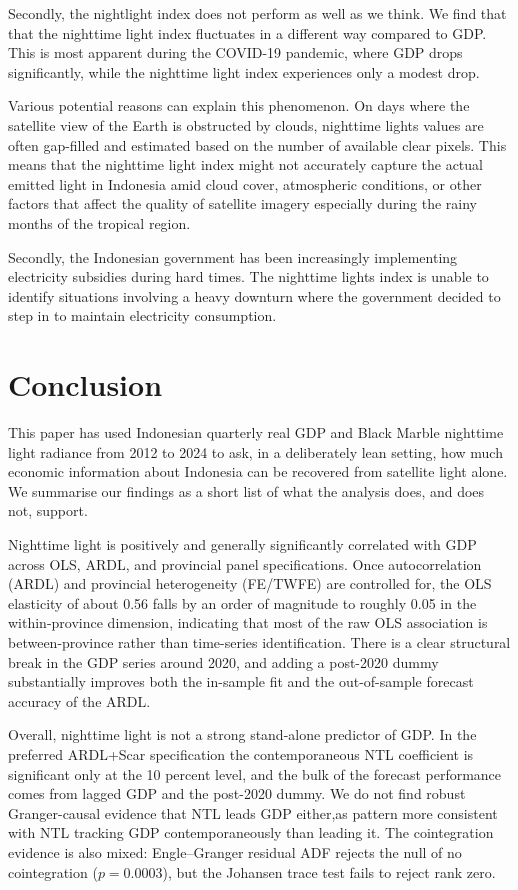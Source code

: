 \documentclass[
  manuscript=article,
  layout=publish,
  year=2026,
  volume=3,
]{den}
\begin{document}
Secondly, the nightlight index does not perform as well as we think. We
find that that the nighttime light index fluctuates in a different way
compared to GDP. This is most apparent during the COVID-19 pandemic,
where GDP drops significantly, while the nighttime light index
experiences only a modest drop.

Various potential reasons can explain this phenomenon. On days where the
satellite view of the Earth is obstructed by clouds, nighttime lights
values are often gap-filled and estimated based on the number of
available clear pixels. This means that the nighttime light index might
not accurately capture the actual emitted light in Indonesia amid cloud
cover, atmospheric conditions, or other factors that affect the quality
of satellite imagery especially during the rainy months of the tropical
region.

Secondly, the Indonesian government has been increasingly implementing
electricity subsidies during hard times. The nighttime lights index is
unable to identify situations involving a heavy downturn where the
government decided to step in to maintain electricity consumption.

\section{Conclusion}\label{conclusion}

This paper has used Indonesian quarterly real GDP and Black Marble
nighttime light radiance from 2012 to 2024 to ask, in a deliberately
lean setting, how much economic information about Indonesia can be
recovered from satellite light alone. We summarise our findings as a
short list of what the analysis does, and does not, support.

Nighttime light is positively and generally significantly correlated
with GDP across OLS, ARDL, and provincial panel specifications. Once
autocorrelation (ARDL) and provincial heterogeneity (FE/TWFE) are
controlled for, the OLS elasticity of about 0.56 falls by an order of
magnitude to roughly 0.05 in the within-province dimension, indicating
that most of the raw OLS association is between-province rather than
time-series identification. There is a clear structural break in the GDP
series around 2020, and adding a post-2020 dummy substantially improves
both the in-sample fit and the out-of-sample forecast accuracy of the
ARDL.

Overall, nighttime light is not a strong stand-alone predictor of GDP.
In the preferred ARDL+Scar specification the contemporaneous NTL
coefficient is significant only at the 10 percent level, and the bulk of
the forecast performance comes from lagged GDP and the post-2020 dummy.
We do not find robust Granger-causal evidence that NTL leads GDP
either,as pattern more consistent with NTL tracking GDP
contemporaneously than leading it. The cointegration evidence is also
mixed: Engle--Granger residual ADF rejects the null of no cointegration
(\(p = 0.0003\)), but the Johansen trace test fails to reject rank zero.
\end{document}
